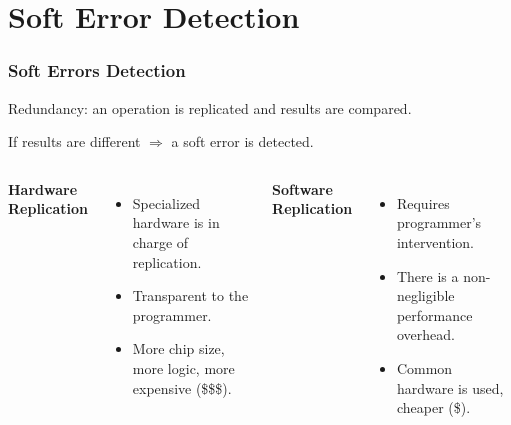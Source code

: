 \documentclass[xcolor=pdftex,dvipsnames,table]{beamer}
\begin{document}
              

\section{Soft Error Detection}

\begin{frame}
	\frametitle{Soft Errors Detection}        
    \begin{shaded}
    	\centerline{Redundancy: an operation is replicated and results are compared.}
        \centerline{If results are different $\Longrightarrow$ a soft error is detected.}\pause
    \end{shaded}      
    
	\begin{columns}[c]
		\column{2.4in}
          \textbf{Hardware Replication}
          \begin{itemize}
              \item Specialized hardware is in charge of replication. 
              \item Transparent to the programmer. 
              \item More chip size, more logic, more expensive (\$\$\$). \pause
          \end{itemize}
		\column{2.4in}
          \textbf{Software Replication}
          \begin{itemize}
              \item Requires programmer's intervention. 
              \item There is a non-negligible performance overhead.
              \item Common hardware is used, cheaper (\$).
          \end{itemize}
    \end{columns}
    
    \begin{shaded}
    	\centerline{}
    \end{shaded}
\end{frame}
\end{document}
